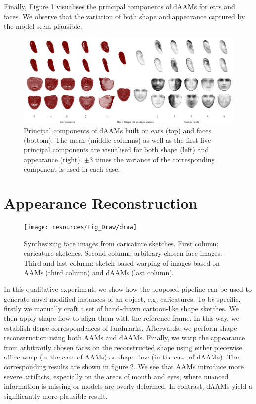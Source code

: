 Finally, Figure \ref{fig:pcamodel} visualises the principal components of dAAMs for ears and faces. We observe that the variation of both shape and appearance captured by the model seem plausible.

\begin{figure}[h]
\centering
\includegraphics[width=\textwidth]{supports/Models/models}
\caption{Principal components of dAAMs built on ears (top) and faces (bottom). The mean (middle columns) as well as the first five principal components are visualised for both shape (left) and appearance (right). $\pm 3$ times the variance of the corresponding component is used in each case.}
\label{fig:pcamodel}
\end{figure}




\section{Appearance Reconstruction}
\label{sec:reconstruct}

\begin{figure}[h]
    \centering
    \texttt{[image: resources/Fig\_Draw/draw]}
    \caption{Synthesizing face images from caricature sketches. First column: caricature sketches. Second column: arbitrary chosen face images. Third and last column: sketch-based warping of images based on AAMs (third column) and dAAMs (last column).}
    \label{fig:draw}
\end{figure}

In this qualitative experiment, we show how the proposed pipeline can be used to generate novel modified instances of an object, e.g. caricatures. To be specific, firstly we manually craft a set of hand-drawn cartoon-like shape sketches. We then apply shape flow to align them with the reference frame. In this way, we establish dense correspondences of landmarks. Afterwards, we perform shape reconstruction using both AAMs and dAAMs. Finally, we warp the appearance from arbitrarily chosen faces on the reconstructed shape using either piecewise affine warp (in the case of AAMs) or shape flow (in the case of dAAMs). The corresponding results are shown in figure \ref{fig:draw}. We see that AAMs introduce more severe artifacts, especially on the areas of mouth and eyes, where nuanced information is missing or models are overly deformed. In contrast, dAAMs yield a significantly more plausible result.



